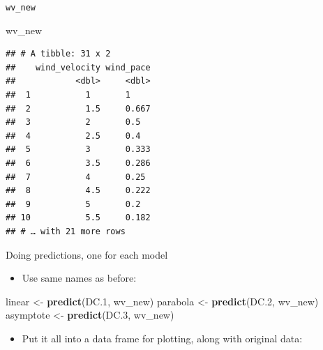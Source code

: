 \documentclass[ignorenonframetext,]{beamer}
\newenvironment{Shaded}{\begin{snugshade}}{\end{snugshade}}
\newcommand{\DataTypeTok}[1]{\textcolor[rgb]{0.13,0.29,0.53}{#1}}
\newcommand{\FloatTok}[1]{\textcolor[rgb]{0.00,0.00,0.81}{#1}}
\newcommand{\KeywordTok}[1]{\textcolor[rgb]{0.13,0.29,0.53}{\textbf{#1}}}
\newcommand{\NormalTok}[1]{#1}
\newcommand{\OperatorTok}[1]{\textcolor[rgb]{0.81,0.36,0.00}{\textbf{#1}}}
\newcommand{\StringTok}[1]{\textcolor[rgb]{0.31,0.60,0.02}{#1}}
\providecommand{\tightlist}{%
  \setlength{\itemsep}{0pt}\setlength{\parskip}{0pt}}
\begin{document}
\begin{frame}[fragile]{\texttt{wv\_new}}
\protect\hypertarget{wv_new}{}

\begin{Shaded}
\begin{Highlighting}[]
\NormalTok{wv_new}
\end{Highlighting}
\end{Shaded}

\begin{verbatim}
## # A tibble: 31 x 2
##    wind_velocity wind_pace
##            <dbl>     <dbl>
##  1           1       1    
##  2           1.5     0.667
##  3           2       0.5  
##  4           2.5     0.4  
##  5           3       0.333
##  6           3.5     0.286
##  7           4       0.25 
##  8           4.5     0.222
##  9           5       0.2  
## 10           5.5     0.182
## # … with 21 more rows
\end{verbatim}

\end{frame}

\begin{frame}[fragile]{Doing predictions, one for each model}
\protect\hypertarget{doing-predictions-one-for-each-model}{}

\begin{itemize}
\tightlist
\item
  Use same names as before:
\end{itemize}

\begin{Shaded}
\begin{Highlighting}[]
\NormalTok{linear <-}\StringTok{ }\KeywordTok{predict}\NormalTok{(DC}\FloatTok{.1}\NormalTok{, wv_new)}
\NormalTok{parabola <-}\StringTok{ }\KeywordTok{predict}\NormalTok{(DC}\FloatTok{.2}\NormalTok{, wv_new)}
\NormalTok{asymptote <-}\StringTok{ }\KeywordTok{predict}\NormalTok{(DC}\FloatTok{.3}\NormalTok{, wv_new)}
\end{Highlighting}
\end{Shaded}

\begin{itemize}
\tightlist
\item
  Put it all into a data frame for plotting, along with original data:
\end{itemize}

\begin{Shaded}
\end{Shaded}

\end{frame}
\end{document}
